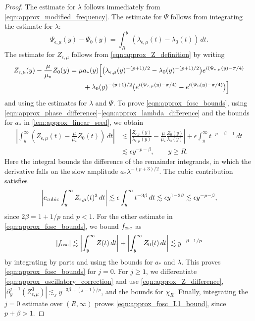 \documentclass[11pt]{amsart}
\theoremstyle{definition}
\theoremstyle{remark}
\numberwithin{equation}{section}
\begin{document}
\begin{proof}
    The estimate for $\lambda$ follows immediately from \eqref{eqn:approx_modified_frequency}. The estimate for $\Psi$ follows from integrating the estimate for $\lambda$:
    \[\Psi_{\epsilon,\mu}(y) - \Psi_0(y) = \int_R^y (\lambda_{\epsilon,\mu}(t) - \lambda_0(t)) \, dt.\]
    The estimate for $Z_{\epsilon,\mu}$ follows from \eqref{eqn:approx_Z_definition} by writing 
    \[
    \begin{aligned}
        Z_{\epsilon,\mu}(y)-\frac{\mu}{\mu_*}Z_0(y)
        &=\mu a_*(y)\Bigl[
        \bigl(\lambda_{\epsilon,\mu}(y)^{-(p+1)/2}-\lambda_0(y)^{-(p+1)/2}\bigr)
        e^{i(\Psi_{\epsilon,\mu}(y)-\pi/4)}\\
        &\qquad+\lambda_0(y)^{-(p+1)/2}
        \bigl(e^{i(\Psi_{\epsilon,\mu}(y)-\pi/4)}-e^{i(\Psi_0(y)-\pi/4)}\bigr)
        \Bigr]
    \end{aligned}
    \]
    and using the estimates for $\lambda$ and $\Psi$. To prove \eqref{eqn:approx_fosc_bounds}, using \eqref{eqn:approx_phase_difference}--\eqref{eqn:approx_lambda_difference} and the bounds for $a_*$ in \cref{lem:approx_linear_seed}, we obtain
    \[
    \begin{aligned}
        \left|\int_y^\infty\left(Z_{\epsilon,\mu}(t)-\frac{\mu}{\mu_*}Z_0(t)\right)\,dt\right|
        &\lesssim
        \left|\frac{Z_{\epsilon,\mu}(y)}{\lambda_{\epsilon,\mu}(y)}
        -\frac{\mu}{\mu_*}\frac{Z_0(y)}{\lambda_0(y)}\right|
        +\epsilon\int_y^\infty t^{-p-\beta-1}\,dt\\
        &\lesssim\epsilon y^{-p-\beta},\qquad y\geq R.
    \end{aligned}
    \]
    Here the integral bounds the difference of the remainder integrands, in which the derivative falls on the slow amplitude $a_*\lambda^{-(p+3)/2}$. The cubic contribution satisfies
    \[
        \left|c_{\textup{cubic}}\int_y^\infty Z_{\epsilon,\mu}(t)^3\,dt\right|
        \lesssim\epsilon\int_y^\infty t^{-3\beta}\,dt
        \lesssim\epsilon y^{1-3\beta}
        \lesssim\epsilon y^{-p-\beta},
    \]
    since $2\beta=1+1/p$ and $p<1$. For the other estimate in \eqref{eqn:approx_fosc_bounds}, we bound $f_{\textup{osc}}$ as
    \[|f_{\textup{osc}}| \lesssim \left|\int_{y}^{\infty}Z(t) \, dt\right| + \left|\int_{y}^{\infty}Z_0(t) \, dt\right| \lesssim y^{-\beta - 1/p}\]
    by integrating by parts and using the bounds for $a_*$ and $\lambda$. This proves \eqref{eqn:approx_fosc_bounds} for $j=0$. For $j\geq1$, we differentiate \eqref{eqn:approx_oscillatory_correction} and use \eqref{eqn:approx_Z_difference}, $|\partial_y^{j-1}(Z_{\epsilon,\mu}^3)|\lesssim_j y^{-3\beta+(j-1)/p}$, and the bounds for $\chi_R$. Finally, integrating the $j=0$ estimate over $(R,\infty)$ proves \eqref{eqn:approx_fosc_L1_bound}, since $p+\beta>1$.
\end{proof}
\end{document}
